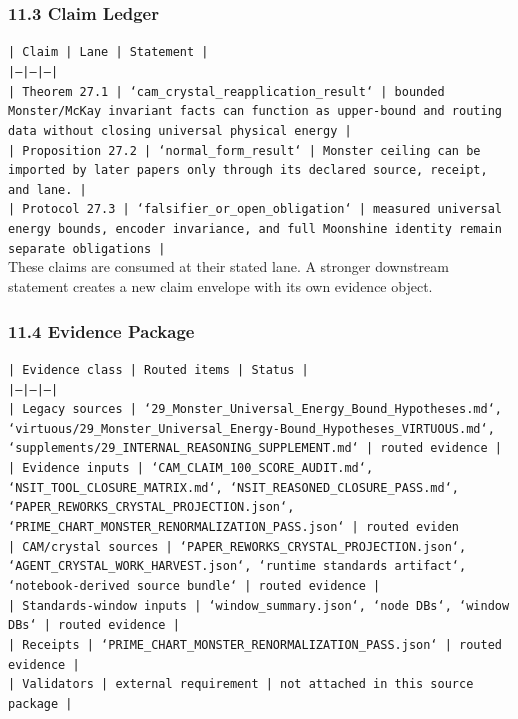 \documentclass[11pt]{article}
\begin{document}
\subsubsection*{11.3 Claim Ledger}

\noindent\texttt{| Claim | Lane | Statement |}\\
\noindent\texttt{|---|---|---|}\\
\noindent\texttt{| Theorem 27.1 | `cam\_crystal\_reapplication\_result` | bounded Monster/McKay invariant facts can function as upper-bound and routing data without closing universal physical energy |}\\
\noindent\texttt{| Proposition 27.2 | `normal\_form\_result` | Monster ceiling can be imported by later papers only through its declared source, receipt, and lane. |}\\
\noindent\texttt{| Protocol 27.3 | `falsifier\_or\_open\_obligation` | measured universal energy bounds, encoder invariance, and full Moonshine identity remain separate obligations |}\\

These claims are consumed at their stated lane. A stronger downstream statement
creates a new claim envelope with its own evidence object.

\subsubsection*{11.4 Evidence Package}

\noindent\texttt{| Evidence class | Routed items | Status |}\\
\noindent\texttt{|---|---|---|}\\
\noindent\texttt{| Legacy sources | `29\_Monster\_Universal\_Energy\_Bound\_Hypotheses.md`, `virtuous/29\_Monster\_Universal\_Energy-Bound\_Hypotheses\_VIRTUOUS.md`, `supplements/29\_INTERNAL\_REASONING\_SUPPLEMENT.md` | routed evidence |}\\
\noindent\texttt{| Evidence inputs | `CAM\_CLAIM\_100\_SCORE\_AUDIT.md`, `NSIT\_TOOL\_CLOSURE\_MATRIX.md`, `NSIT\_REASONED\_CLOSURE\_PASS.md`, `PAPER\_REWORKS\_CRYSTAL\_PROJECTION.json`, `PRIME\_CHART\_MONSTER\_RENORMALIZATION\_PASS.json` | routed eviden}\\
\noindent\texttt{| CAM/crystal sources | `PAPER\_REWORKS\_CRYSTAL\_PROJECTION.json`, `AGENT\_CRYSTAL\_WORK\_HARVEST.json`, `runtime standards artifact`, `notebook-derived source bundle` | routed evidence |}\\
\noindent\texttt{| Standards-window inputs | `window\_summary.json`, `node DBs`, `window DBs` | routed evidence |}\\
\noindent\texttt{| Receipts | `PRIME\_CHART\_MONSTER\_RENORMALIZATION\_PASS.json` | routed evidence |}\\
\noindent\texttt{| Validators | external requirement | not attached in this source package |}\\
\end{document}
